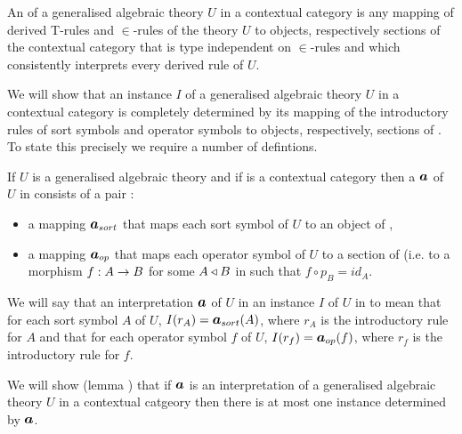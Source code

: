 \begin{definition}
An  of a generalised algebraic theory $U$ in a contextual category \catcw is  any mapping 
of derived T-rules and $\in$-rules of the theory $U$ to objects, respectively sections of the contextual category \catcw that
is type independent on $\in$-rules and which
consistently interprets every derived rule of $U$.
\end{definition}

We will show that an instance $I$ of a generalised algebraic theory $U$ in a contextual category \catcw is
completely determined by its mapping of the introductory rules of sort symbols and operator symbols to
objects, respectively, sections of \catc. To state this precisely  we require a number of defintions.

\begin{definition}
If $U$ is a generalised algebraic theory  and if \catcw is a contextual category then
a  $\iI$ of  $U$ in \catcw consists of a pair :
\begin{itemize}
\item a mapping $\Isort$ that maps each sort symbol of $U$ to  an object of \catc,
\item a mapping $\Iop$ that maps each operator symbol of $U$ to a section of \catcw (i.e. to a morphism $f: A \rightarrow B$ for some 
$A \triangleleft B$ in \catcw such that $f \circ p_B=id_A$.
\end{itemize}
\end{definition}

We will say that  an interpretation $\iI$ of $U$ in \catcw {} an  instance $I$ of $U$ in \catcw to mean that for each sort symbol $A$ of $U$,
$I(r_A) = \iI_{sort}(A)$, where $r_A$ is the introductory rule for $A$ and that for each operator symbol
$f$ of $U$,   $I(r_f) = \iI_{op}(f)$, where $r_f$ is the introductory rule for $f$.

We will show (lemma ) that 
if $\iI$ is an interpretation of a generalised algebraic theory $U$ in a contextual catgeory \catcw then
there is at most one  instance determined by $\iI$.

